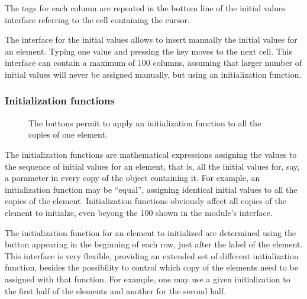 \documentclass [11pt,a4paper] {book}
\begin{document}
The tags for each column are repeated in the bottom line of the initial values interface referring to the cell containing the cursor.

The interface for the initial values allows to insert manually the initial values for an element. Typing one value and pressing the key  moves to the next cell. This interface can contain a maximum of 100 columns, assuming that larger number of initial values will never be assigned manually, but using an initialization function.

\subsubsection{Initialization functions}

\begin{figure}[ht]
  \centering
  \caption{\small The  buttons permit to apply an initialization function to all the copies of one element.}
  \label{fig:setall}
\end{figure}

The initialization functions are mathematical expressions assigning the values to the sequence of initial values for an element, that is, all the initial values for, say, a parameter in every copy of the object containing it. For example, an initialization function may be ``equal'', assigning identical initial values to all the copies of the element. Initialization functions obviously affect all copies of the element to initialze, even beyong the 100 shown in the module's interface.

The initialization function for an element to initialized are determined using the button  appearing in the beginning of each row, just after the label of the element. This interface is very flexible, providing an extended set of different initialization function, besides the possibility to control which copy of the elements need to be assigned with that function. For example, one may use a given initialization to the first half of the elements and another for the second half. 
\end{document}
